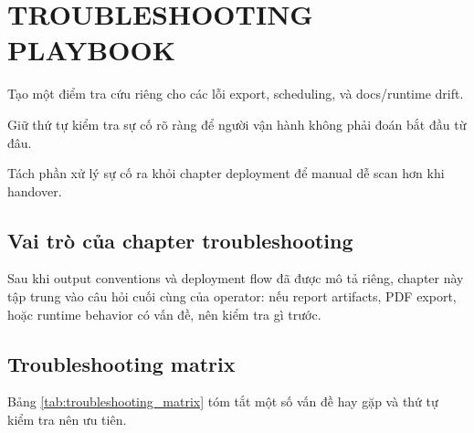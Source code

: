 \chapter{TROUBLESHOOTING PLAYBOOK}

\begin{ChapterObjectives}
\item Tạo một điểm tra cứu riêng cho các lỗi export, scheduling, và docs/runtime drift.
\item Giữ thứ tự kiểm tra sự cố rõ ràng để người vận hành không phải đoán bắt đầu từ đâu.
\item Tách phần xử lý sự cố ra khỏi chapter deployment để manual dễ scan hơn khi handover.
\end{ChapterObjectives}

\section{Vai trò của chapter troubleshooting}

Sau khi output conventions và deployment flow đã được mô tả riêng, chapter này tập trung vào câu hỏi cuối cùng của operator: nếu report artifacts, PDF export, hoặc runtime behavior có vấn đề, nên kiểm tra gì trước.

\section{Troubleshooting matrix}

Bảng \ref{tab:troubleshooting_matrix} tóm tắt một số vấn đề hay gặp và thứ tự kiểm tra nên ưu tiên.

